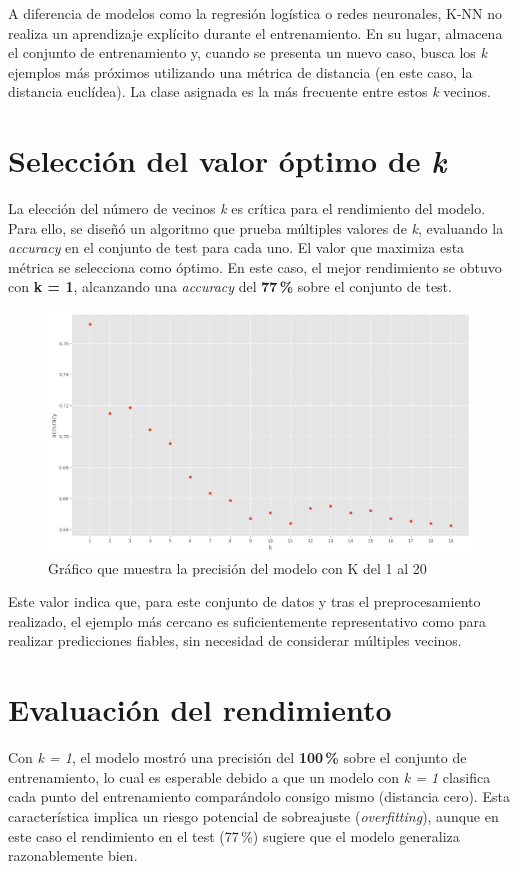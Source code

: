 \documentclass{report}[14pt]
\begin{document}
A diferencia de modelos como la regresión logística o redes neuronales, K-NN no realiza un aprendizaje explícito durante el entrenamiento. En su lugar, almacena el conjunto de entrenamiento y, cuando se presenta un nuevo caso, busca los \textit{k} ejemplos más próximos utilizando una métrica de distancia (en este caso, la distancia euclídea). La clase asignada es la más frecuente entre estos \textit{k} vecinos.

\section*{Selección del valor óptimo de \textit{k}}

La elección del número de vecinos \textit{k} es crítica para el rendimiento del modelo. Para ello, se diseñó un algoritmo que prueba múltiples valores de \textit{k}, evaluando la \textit{accuracy} en el conjunto de test para cada uno. El valor que maximiza esta métrica se selecciona como óptimo. En este caso, el mejor rendimiento se obtuvo con \textbf{k = 1}, alcanzando una \textit{accuracy} del \textbf{77\,\%} sobre el conjunto de test.

\begin{figure}
    \centering
    \includegraphics[width=0.68\linewidth]{mejor k.png}
    \caption{Gráfico que muestra la precisión del modelo con K del 1 al 20}
    \label{fig:boxplot-age}
\end{figure}

Este valor indica que, para este conjunto de datos y tras el preprocesamiento realizado, el ejemplo más cercano es suficientemente representativo como para realizar predicciones fiables, sin necesidad de considerar múltiples vecinos.

\newpage
\section*{Evaluación del rendimiento}

Con \textit{k = 1}, el modelo mostró una precisión del \textbf{100\,\%} sobre el conjunto de entrenamiento, lo cual es esperable debido a que un modelo con \textit{k = 1} clasifica cada punto del entrenamiento comparándolo consigo mismo (distancia cero). Esta característica implica un riesgo potencial de sobreajuste (\textit{overfitting}), aunque en este caso el rendimiento en el test (77\,\%) sugiere que el modelo generaliza razonablemente bien.
\end{document}
